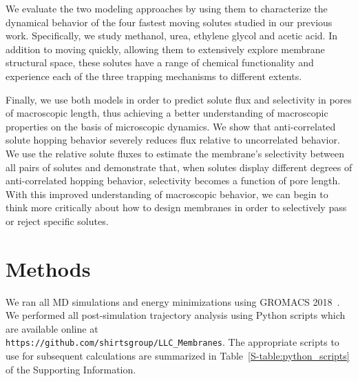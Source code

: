 \documentclass[12pt]{article}
\begin{document}
  We evaluate the two modeling approaches by using them to characterize the dynamical
  behavior of the four fastest moving solutes studied in our previous work.
  Specifically, we study methanol, urea, ethylene glycol and acetic acid. In addition
  to moving quickly, allowing them to extensively explore membrane structural space,
  these solutes have a range of chemical functionality and experience each of the 
  three trapping mechanisms to different extents.
  
  Finally, we use both models in order to predict solute flux and selectivity in 
  pores of macroscopic length, thus achieving a better understanding
  of macroscopic properties on the basis of microscopic dynamics. We show that 
  anti-correlated solute hopping behavior severely reduces flux relative to 
  uncorrelated behavior. We use the relative solute fluxes to estimate the 
  membrane's selectivity between all pairs of solutes and demonstrate that, when 
  solutes display different degrees of anti-correlated hopping behavior, selectivity
  becomes a function of pore length. With this improved understanding of 
  macroscopic behavior, we can begin to think more critically about how to design 
  membranes in order to selectively pass or reject specific solutes.
  
  

  \section{Methods}
    
  We ran all MD simulations and energy minimizations using GROMACS 2018~\cite{bekker_gromacs:_1993,berendsen_gromacs:_1995,van_der_spoel_gromacs:_2005,hess_gromacs_2008}.  %
  We performed all post-simulation trajectory analysis using Python scripts which 
  are available online at \\ \texttt{https://github.com/shirtsgroup/LLC\_Membranes}.
  The appropriate scripts to use for subsequent calculations are summarized in 
  Table~\ref{S-table:python_scripts} of the Supporting Information.
  
\end{document}

